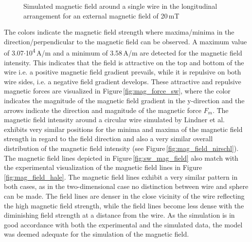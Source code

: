 \begin{figure}[H]
        \caption[Simulated magnetic field around a single wire]{Simulated magnetic field around a single wire in the longitudinal arrangement for an external magnetic field of 20\,mT}
        \label{fig:sw_fm_mag_field}
  \end{figure}

% 

The colors indicate the magnetic field strength where maxima/minima in the direction/perpendicular to the magnetic field can be observed. A maximum value of 3.07$\cdotp$10\textsuperscript{4}\,A/m and a minimum of 3.58\,A/m are detected for the magnetic field intensity. This indicates that the field is attractive on the top and bottom of the wire i.e. a positive magnetic field gradient prevails, while it is repulsive on both wire sides, i.e. a negative field gradient develops. These attractive and repulsive magnetic forces are visualized in Figure\,\ref{fig:mag_force_sw}, where the color indicates the magnitude of the magnetic field gradient in the y-direction and the arrows indicate the direction and magnitude of the magnetic force $F_{m}$. The magnetic field intensity around a circular wire simulated by Lindner et al. \cite{lindner2013simulation} exhibits very similar positions for the minima and maxima of the magnetic field strength in regard to the field direction and also a very similar overall distribution of the magnetic field intensity (see Figure\,\ref{fig:mag_field_nirschl}). The magnetic field lines depicted in Figure\,\ref{fig:sw_mag_field} also match with the experimental visualization of the magnetic field lines in Figure\,\ref{fig:mag_field_hale}. The magnetic field lines exhibit a very similar pattern in both cases, as in the two-dimensional case no distinction between wire and sphere can be made. The field lines are denser in the close vicinity of the wire reflecting the high magnetic field strength, while the field lines become less dense with the diminishing field strength at a distance from the wire. As the simulation is in good accordance with both the experimental and the simulated data, the model was deemed adequate for the simulation of the magnetic field.  

